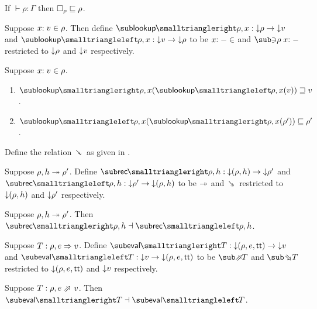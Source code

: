 \begin{lemma}
\label{lem:core-language:hole-env}If $\vdash \rho: \Gamma$ then $\square_{\rho} \sqsubseteq \rho$.
\end{lemma}

\begin{definition}
   Suppose $x{:}\;v\in{\rho}$. Then define $\envLookupFwdF{\rho,x}: \Below{\rho} \to \Below{v}$ and $\envLookupBwdF{\rho,x}: \Below{v} \to \Below{\rho}$ to be $x{:}\;-\in$ and $\envLookupBwdR{\rho}\bind{x}{-}$ restricted to ${\downarrow}{\rho}$ and ${\downarrow}{v}$ respectively.
\end{definition}

\begin{lemma}
\label{lem:core-language:env-get-put}Suppose $x{:}\;v\in{\rho}$.
\begin{enumerate}
   \item \label{lem:core-language:env-get-put:1} $\envLookupFwdF{\rho,x}(\envLookupBwdF{\rho,x}(v)) \geq v$.
   \item \label{lem:core-language:env-get-put:2} $\envLookupBwdF{\rho,x}(\envLookupFwdF{\rho,x}(\rho')) \leq \rho'$.
\end{enumerate}
\end{lemma}

\begin{definition}
   \label{def:core-language:closeDefs-bwd}
   Define the relation $\closeDefsBwdR$ as given in .
\end{definition}

\begin{definition}
   Suppose $\rho, h \twoheadrightarrow \rho'$. Define $\closeDefsFwdF{\rho,h}: \Below{(\rho, h)} \to \Below{\rho'}$ and $\closeDefsBwdF{\rho,h}: \Below{\rho'} \to \Below{(\rho, h)}$ to be $\twoheadrightarrow$ and $\closeDefsBwdR$ restricted to ${\downarrow}{(\rho, h)}$ and ${\downarrow}{\rho'}$ respectively.
\end{definition}

\begin{theorem}
\label{thm:core-language:closeDefs:gc}
   Suppose $\rho, h \twoheadrightarrow \rho'$.  Then $\closeDefsFwdF{\rho,h} \adjoint \closeDefsBwdF{\rho,h}$.
\end{theorem}

\begin{definition}
   Suppose $T: \rho, e \Rightarrow v$. Define $\evalFwdF{T}: \Below{(\rho, e, \TT)} \to \Below{v}$ and $\evalBwdF{T}: \Below{v} \to \Below{(\rho, e, \TT)}$ to be $\evalFwdR{T}$ and $\evalBwdR{T}$ restricted to ${\downarrow}{(\rho, e, \mathsf{tt})}$ and ${\downarrow}{v}$ respectively.
\end{definition}

\begin{theorem}
\label{thm:core-language:eval:gc}
   Suppose $T: \rho, e \evalFwdS v$.  Then $\evalFwdF{T} \adjoint \evalBwdF{T}$.
\end{theorem}
